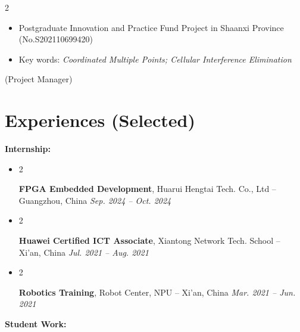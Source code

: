 \documentclass[10pt, letterpaper]{article}
\newenvironment{highlights}{
    \begin{itemize}[
        topsep=0.10 cm,
        parsep=0.10 cm,
        partopsep=0pt,
        itemsep=0pt,
        leftmargin=0 cm + 10pt
    ]
}{
    \end{itemize}
} %
\newenvironment{twocolentry}[2][]{
    \onecolentry
    \def\secondColumn{#2}
    \setcolumnwidth{\fill, 4.5 cm}
    \begin{paracol}{2}
}{
    \switchcolumn \raggedleft \secondColumn
    \end{paracol}
    \endonecolentry
} %
\begin{document}
       \vspace{0.10 cm}
       
       \begin{twocolentry}{
       		(Project Manager) 
       	}
       	\begin{highlights}
       		\item Postgraduate Innovation and Practice Fund Project in Shaanxi Province {\footnotesize{(No.S202110699420)}}
       		\item Key words: \textit{Coordinated Multiple Points; Cellular Interference Elimination}
       	\end{highlights}
       \end{twocolentry}


    \section{Experiences {\footnotesize{(Selected)}}}
    \textbf{Internship:}
        \hspace{0.5 cm} \begin{highlights}
        \item \begin{twocolentry}{
            \textit{Sep. 2024 – Oct. 2024}
        }
            \textbf{FPGA Embedded Development}, Huarui Hengtai Tech. Co., Ltd -- Guangzhou, China\end{twocolentry}
        \end{highlights}

        \begin{highlights}
        \item \begin{twocolentry}{
            \textit{Jul. 2021 – Aug. 2021}
        }
            \textbf{Huawei Certified ICT Associate}, Xiantong Network Tech. School  -- Xi'an, China\end{twocolentry}
        \end{highlights}

        \begin{highlights}
        \item \begin{twocolentry}{
            \textit{Mar. 2021 – Jun. 2021}
        }
            \textbf{Robotics Training}, Robot Center, NPU -- Xi'an, China\end{twocolentry}
        \end{highlights}
        
    \textbf{Student Work:}
        
\end{document}
